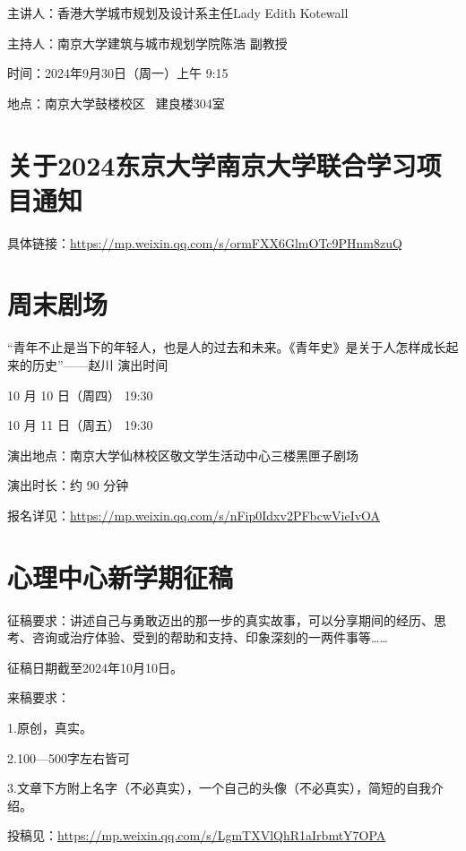 \documentclass[letterpaper, 12pt]{article}
\begin{document}
\begin{multicols}{2}
主讲人：香港大学城市规划及设计系主任Lady Edith Kotewall

主持人：南京大学建筑与城市规划学院陈浩 副教授

时间：2024年9月30日（周一）上午 9:15

地点：南京大学鼓楼校区  建良楼304室
\section{关于2024东京大学南京大学联合学习项目通知}
具体链接：\url{https://mp.weixin.qq.com/s/ormFXX6GlmOTc9PHnm8zuQ}

\section{周末剧场}
“青年不止是当下的年轻人，也是人的过去和未来。《青年史》是关于人怎样成长起来的历史”——赵川
演出时间

10 月 10 日（周四） 19:30

10 月 11 日（周五） 19:30





演出地点：南京大学仙林校区敬文学生活动中心三楼黑匣子剧场

演出时长：约 90 分钟

报名详见：\url{https://mp.weixin.qq.com/s/nFip0Idxv2PFbcwVieIvOA}
\section{心理中心新学期征稿}
征稿要求：讲述自己与勇敢迈出的那一步的真实故事，可以分享期间的经历、思考、咨询或治疗体验、受到的帮助和支持、印象深刻的一两件事等……

征稿日期截至2024年10月10日。

来稿要求：

1.原创，真实。

2.100—500字左右皆可

3.文章下方附上名字（不必真实），一个自己的头像（不必真实），简短的自我介绍。

投稿见：\url{https://mp.weixin.qq.com/s/LgmTXVlQhR1aIrbmtY7OPA}



\end{multicols}
\end{document}
